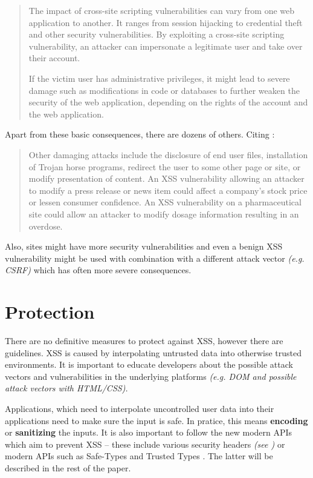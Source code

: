 \begin{quotation}
  The impact of cross-site scripting vulnerabilities can vary from one web application to another.
  It ranges from session hijacking to credential theft and other security vulnerabilities. By
  exploiting a cross-site scripting vulnerability, an attacker can impersonate a legitimate user and
  take over their account.

  If the victim user has administrative privileges, it might lead to severe damage such as
  modifications in code or databases to further weaken the security of the web application,
  depending on the rights of the account and the web application.
\end{quotation}

Apart from these basic consequences, there are dozens of others. Citing \cite{xss_owasp_intro}:

\begin{quotation}
  Other damaging attacks include the disclosure of end user files, installation of Trojan horse
  programs, redirect the user to some other page or site, or modify presentation of content. An XSS
  vulnerability allowing an attacker to modify a press release or news item could affect a company’s
  stock price or lessen consumer confidence. An XSS vulnerability on a pharmaceutical site could
  allow an attacker to modify dosage information resulting in an overdose.
\end{quotation}

Also, sites might have more security vulnerabilities and even a benign XSS vulnerability might be
used with combination with a different attack vector \emph{(e.g. CSRF)} which has often more severe
consequences.

\section{Protection}

There are no definitive measures to protect against XSS, however there are guidelines. XSS is caused
by interpolating untrusted data into otherwise trusted environments. It is important to educate
developers about the possible attack vectors and vulnerabilities in the underlying platforms
\emph{(e.g. DOM and possible attack vectors with HTML/CSS).}

Applications, which need to interpolate uncontrolled user data into their applications need to make
sure the input is safe. In pratice, this means \textbf{encoding} or \textbf{sanitizing} the inputs.
It is also important to follow the new modern APIs which aim to prevent XSS -- these include various
security headers \emph{(see \cite{cypress_xss_consequences})} or modern APIs such as Safe-Types
\cite{safe_types} and Trusted Types \cite{trusted_types_into}. The latter will be described in the
rest of the paper.
